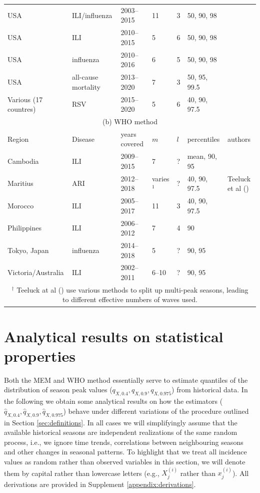 \documentclass{article}
\begin{document}
\begin{table}[h!]
\begin{tabular}{l l l l l l l}
USA & ILI/influenza & 2003--2015 & 11 & 3 & 50, 90, 98 & \cite{Biggerstaff2017}\\
USA & ILI & 2010--2015 & 5 & 6 & 50, 90, 98 & \cite{Dahlgren2018}\\
USA & influenza & 2010--2016 & 6 & 5 & 50, 90, 98 & \cite{Dahlgren2019}\\
USA & all-cause mortality & 2013--2020 & 7 & 3 & 50, 95, 99.5 & \cite{Dahlgren2022}\\
Various (17 countres) & RSV & 2015--2020 & 5 & 6 & 40, 90, 97.5 & \cite{Wang2023} \\ %
\midrule 
\multicolumn{7}{c}{(b) WHO method}\\
\toprule
Region & Disease & years covered & $m$ & $l$ & percentiles & authors\\
\midrule
Cambodia & ILI & 2009--2015 & 7 & ? & mean, 90, 95 & \cite{Ly2017}\\
Maritius & ARI & 2012--2018 & varies$^1$ & ? & 40, 90, 97.5 & Teeluck et al (\citeyear{Teeluck2021}) \\
Morocco & ILI & 2005--2017 & 11 & 3 & 40, 90, 97.5 & \cite{Rguig2020}\\
Philippines & ILI & 2006--2012 & 7 & 4 & 90 & \cite{Lucero2016}\\
Tokyo, Japan & influenza & 2014--2018 & 5 & ? & 90, 95 & \cite{Matsuda2022} \\
Victoria/Australia & ILI & 2002--2011 & 6--10 & ? & 90, 95 & \cite{Tay2013}\\
\bottomrule
\multicolumn{7}{c}{$^\dagger$ Teeluck at al (\citeyear{Teeluck2021}) use various methods to split up multi-peak seasons, leading to different effective numbers of waves used.}\\ 
\end{tabular}
\end{table}



\section{Analytical results on statistical properties}
\label{sec:analytical_results}

Both the MEM and WHO method essentially serve to estimate quantiles of the distribution of season peak values ($q_{X, 0.4}, q_{X, 0.9}, q_{X, 0.975}$) from historical data. In the following we obtain some analytical results on how the estimators ($\hat{q}_{X, 0.4}, \hat{q}_{X, 0.9}, \hat{q}_{X, 0.975}$) behave under different variations of the procedure outlined in Section \ref{sec:definitions}. In all cases we will simplifyingly assume that the available historical seasons are independent realizations of the same random process, i.e., we ignore time trends, correlations between neighbouring seasons and other changes in seasonal patterns. To highlight that we treat all incidence values as random rather than observed variables in this section, we will denote them by capital rather than lowercase letters (e.g., $X_j^{(i)}$ rather than $x_j^{(i)}$). All derivations are provided in Supplement \ref{appendix:derivations}.
\end{document}
